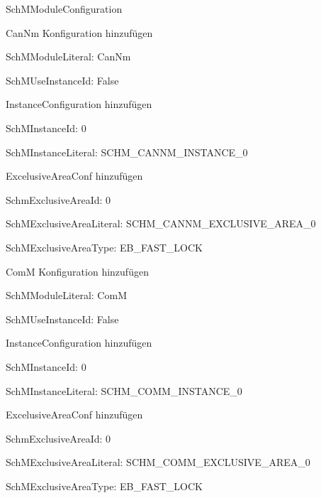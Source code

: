 \begin{compactitem}
    \item SchMModuleConfiguration
    \begin{compactitem}
        \item CanNm Konfiguration hinzufügen
        \begin{compactitem}
            \item SchMModuleLiteral: CanNm
            \item SchMUseInstanceId: False
            \item InstanceConfiguration hinzufügen
            \item SchMInstanceId: 0
            \item SchMInstanceLiteral: SCHM\_CANNM\_INSTANCE\_0
            \item ExcelusiveAreaConf hinzufügen
            \item SchmExclusiveAreaId: 0
            \item SchMExclusiveAreaLiteral: SCHM\_CANNM\_EXCLUSIVE\_AREA\_0
            \item SchMExclusiveAreaType: EB\_FAST\_LOCK
        \end{compactitem}
        \item ComM Konfiguration hinzufügen
        \begin{compactitem}
            \item SchMModuleLiteral: ComM
            \item SchMUseInstanceId: False
            \item InstanceConfiguration hinzufügen
            \item SchMInstanceId: 0
            \item SchMInstanceLiteral: SCHM\_COMM\_INSTANCE\_0
            \item ExcelusiveAreaConf hinzufügen
            \item SchmExclusiveAreaId: 0
            \item SchMExclusiveAreaLiteral: SCHM\_COMM\_EXCLUSIVE\_AREA\_0
            \item SchMExclusiveAreaType: EB\_FAST\_LOCK
        \end{compactitem}
    \end{compactitem}




\end{compactitem}
